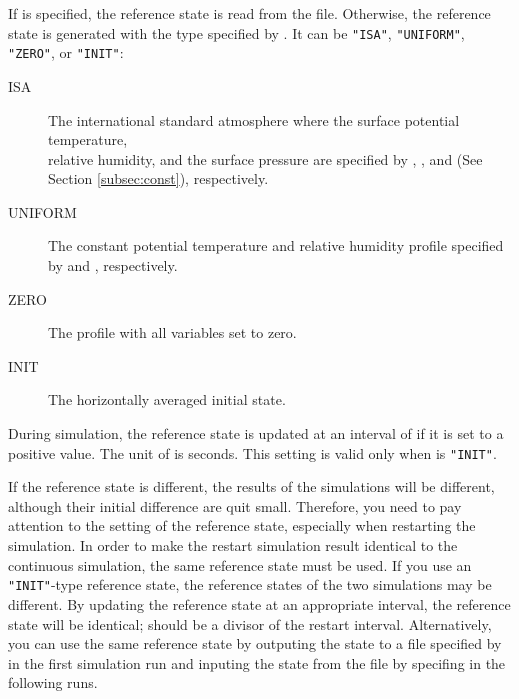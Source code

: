 If  is specified, the reference state is read from the file.
Otherwise, the reference state is generated with the type specified by .
It can be \verb|"ISA"|, \verb|"UNIFORM"|, \verb|"ZERO"|, or \verb|"INIT"|:
\begin{description}
\item[ISA]
  The international standard atmosphere where the surface potential temperature, \\
  relative humidity, and the surface pressure are specified by , , and  (See Section \ref{subsec:const}), respectively.
\item[UNIFORM]
  The constant potential temperature and relative humidity profile specified \\
  by  and , respectively.
\item[ZERO]
  The profile with all variables set to zero.
\item[INIT]
  The horizontally averaged initial state.
\end{description}

During simulation, the reference state is updated at an interval of  if it is set to a positive value.
The unit of  is seconds.
This setting is valid only when  is \verb|"INIT"|.


If the reference state is different, the results of the simulations will be different, although their initial difference are quit small.
Therefore, you need to pay attention to the setting of the reference state, especially when restarting the simulation.
In order to make the restart simulation result identical to the continuous simulation, the same reference state must be used.
If you use an \verb|"INIT"|-type reference state, the reference states of the two simulations may be different.
By updating the reference state at an appropriate interval, the reference state will be identical;  should be a divisor of the restart interval.
Alternatively, you can use the same reference state by outputing the state to a file specified by  in the first simulation run and inputing the state from the file by specifing  in the following runs.

